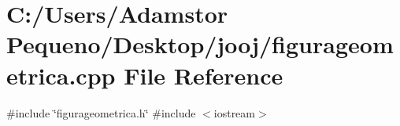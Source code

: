 \section{C\+:/\+Users/\+Adamstor Pequeno/\+Desktop/jooj/figurageometrica.cpp File Reference}
\label{figurageometrica_8cpp}
{\ttfamily \#include \char`\"{}figurageometrica.\+h\char`\"{}}\newline
{\ttfamily \#include $<$iostream$>$}\newline
